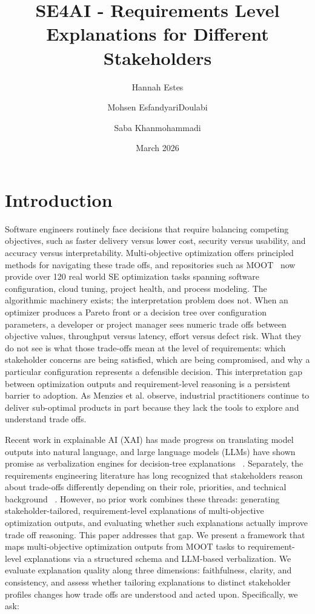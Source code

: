 \documentclass[sigconf,review]{acmart}
\title{SE4AI - Requirements Level Explanations for Different Stakeholders}
\author{Hannah Estes}
\author{Mohsen EsfandyariDoulabi}
\author{Saba Khanmohammadi}
\date{March 2026}
\begin{document}
\maketitle

\section{Introduction}
Software engineers routinely face decisions that require balancing competing objectives, such as faster delivery versus lower cost, security versus usability, and accuracy versus interpretability. Multi-objective optimization offers principled methods for navigating these trade offs, and repositories such as MOOT~\cite{menzies2025moot} now provide over 120 real world SE optimization tasks spanning software configuration, cloud tuning, project health, and process modeling. The algorithmic machinery exists; the interpretation problem does not. 
When an optimizer produces a Pareto front or a decision tree over configuration parameters, a developer or project manager sees numeric trade offs between objective values, throughput versus latency, effort versus defect risk. What they do not see is what those trade-offs mean at the level of requirements: which stakeholder concerns are being satisfied, which are being compromised, and why a particular configuration represents a defensible decision. This interpretation gap between optimization outputs and requirement-level reasoning is a persistent barrier to adoption. As Menzies et al. observe, industrial practitioners continue to deliver sub-optimal products in part because they lack the tools to explore and understand trade offs.

Recent work in explainable AI (XAI) has made progress on translating model outputs into natural language, and large language models (LLMs) have shown promise as verbalization engines for decision-tree explanations ~\cite{serafim2024exploring}. Separately, the requirements engineering literature has long recognized that stakeholders reason about trade-offs differently depending on their role, priorities, and technical background ~\cite{hujainah2018software}. However, no prior work combines these threads: generating stakeholder-tailored, requirement-level explanations of multi-objective optimization outputs, and evaluating whether such explanations actually improve trade off reasoning.     
This paper addresses that gap. We present a framework that maps multi-objective optimization outputs from MOOT tasks to requirement-level explanations via a structured schema and LLM-based verbalization. We evaluate explanation quality along three dimensions: faithfulness, clarity, and consistency, and assess whether tailoring explanations to distinct stakeholder profiles changes how trade offs are understood and acted upon. Specifically, we ask:
\end{document}

